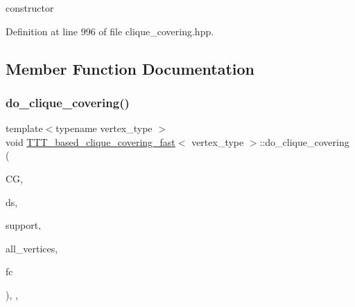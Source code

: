 constructor 



Definition at line 996 of file clique\+\_\+covering.\+hpp.



\subsection{Member Function Documentation}
\mbox{\label{classTTT__based__clique__covering__fast_a64be6008ee231bbaf326cef4b502e643}} 
\subsubsection{\texorpdfstring{do\+\_\+clique\+\_\+covering()}{do\_clique\_covering()}}
{\footnotesize\ttfamily template$<$typename vertex\+\_\+type $>$ \\
void \hyperlink{classTTT__based__clique__covering__fast}{T\+T\+T\+\_\+based\+\_\+clique\+\_\+covering\+\_\+fast}$<$ vertex\+\_\+type $>$\+::do\+\_\+clique\+\_\+covering (\begin{DoxyParamCaption}\item[{const \hyperlink{clique__covering__graph_8hpp_ac7a90ca8b64cfc536aaf17bc81186c18}{cc\+\_\+compatibility\+\_\+graph\+Ref}}]{CG,  }\item[{typename boost\+::disjoint\+\_\+sets$<$ \hyperlink{clique__covering__graph_8hpp_af170aff46b9e4328f1ad9b119cf78b4a}{rank\+\_\+pmap\+\_\+type}, \hyperlink{clique__covering__graph_8hpp_af4c454ac367cfb12e29c98e6bc942a06}{pred\+\_\+pmap\+\_\+type} $>$ \&}]{ds,  }\item[{\hyperlink{classCustomUnorderedSet}{Custom\+Unordered\+Set}$<$ \hyperlink{clique__covering__graph_8hpp_a9cb45047ea8c5ed95a8cfa90494345aa}{C\+\_\+vertex} $>$ \&}]{support,  }\item[{const \hyperlink{classCustomUnorderedSet}{Custom\+Unordered\+Set}$<$ \hyperlink{clique__covering__graph_8hpp_a9cb45047ea8c5ed95a8cfa90494345aa}{C\+\_\+vertex} $>$ \&}]{all\+\_\+vertices,  }\item[{const \hyperlink{structfilter__clique}{filter\+\_\+clique}$<$ vertex\+\_\+type $>$ \&}]{fc }\end{DoxyParamCaption})\hspace{0.3cm}{\ttfamily [inline]}, {\ttfamily [override]}, {\ttfamily [virtual]}}

